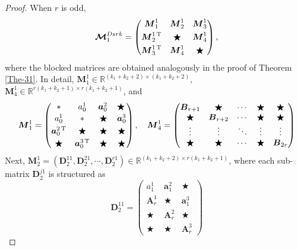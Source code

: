 \documentclass[12pt]{article}
\begin{document}
\begin{proof}
When $r$ is odd,
\begin{equation*}
\boldsymbol{\mathcal{M}}_{1}^{Dsrk}=\begin{pmatrix}
	\boldsymbol{M}_{1}^{1}  &  \boldsymbol{M}_{2}^{1} &  \boldsymbol{M}_{3}^{1} \\[3pt]
	\boldsymbol{M}_{2}^{1\,\rm{T}} & \bigstar & \boldsymbol{M}_{4}^{1} \\[3pt]
	\boldsymbol{M}_{3}^{1\,\rm{T}}&  \boldsymbol{M}_{4}^{1}  & \bigstar
\end{pmatrix},
\end{equation*}
where the blocked matrices are obtained analogously in the proof of Theorem \ref{The-31}. In detail, $\boldsymbol{M}_{1}^{1}\in \mathbb{R}^{(k_{1}+k_{2}+2)\times (k_{1}+k_{2}+2)}$, $\boldsymbol{M}_{4}^{1}\in \mathbb{R}^{r(k_{1}+k_{2}+1)\times r(k_{1}+k_{2}+1)}$, and
\begin{equation*}
	\boldsymbol{M}_{1}^{1} =\begin{pmatrix}
*& a_{0}^{1} &\boldsymbol{a}_{0}^{2\,}& \bigstar\,\\[2pt]
a_{0}^{1} &* &\bigstar&\boldsymbol{a}_{0}^{3}\\[3pt]
\boldsymbol{a}_{0}^{2\,{\rm T}}& \bigstar & \bigstar & \bigstar\\[3pt]
\bigstar&\boldsymbol{a}_{0}^{3\,{\rm T}}  & \bigstar & \bigstar
\end{pmatrix},\quad
\boldsymbol{M}_{4}^{1} =\begin{pmatrix}
\boldsymbol{B}_{r+1}& \bigstar & \cdots & \bigstar &\bigstar\\
\bigstar & \boldsymbol{B}_{r+2}& \cdots & \bigstar &\bigstar\\
\vdots & \vdots &\ddots &\vdots &\vdots \\
\bigstar & \bigstar & \cdots & \bigstar &\boldsymbol{B}_{2r}\\
\end{pmatrix}
\end{equation*}
Next, $\boldsymbol{M}_{2}^{1} =(\boldsymbol{D}^{11}_{2},\boldsymbol{D}^{21}_{2},\cdots,\boldsymbol{D}^{r1}_{2})\in\mathbb{R}^{(k_{1}+k_{2}+2)\times r(k_{1}+k_{2}+1)}$, where each sub-matrix $\boldsymbol{D}^{j1}_{2}$ is structured as
$$\boldsymbol{D}^{11}_{2}=\begin{pmatrix}
{a}_{1}^{1} &\boldsymbol{a}_{1}^{2} &\bigstar\\[2pt]
\boldsymbol{A}_{r}^{1}&\bigstar&\boldsymbol{a}_{1}^{3}\\
\bigstar &\boldsymbol{A}_{r}^{2}&\bigstar\\
\bigstar&\bigstar&\boldsymbol{A}_{r}^{3}

\end{pmatrix}$$
\end{proof}
\end{document}
